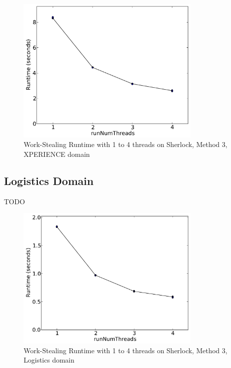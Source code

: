 \documentclass[12pt,twoside,abbrevs,msc,ai,notimes,logo,sansheadings]{infthesis}
\begin{document}
  \begin{figure}[!htbp]
  \begin{centering}
  \includegraphics[width=0.8\textwidth]{images/threads-xper5-sherlock-3-1}
  \par\end{centering}
  \caption{Work-Stealing Runtime with 1 to 4 threads on Sherlock, Method 3, XPERIENCE domain}
  \end{figure}
  
  \subsection{Logistics Domain}
  TODO
  
  \begin{figure}[!htbp]
  \begin{centering}
  \includegraphics[width=0.8\textwidth]{images/threads-log3-sherlock-3-1}
  \par\end{centering}
  \caption{Work-Stealing Runtime with 1 to 4 threads on Sherlock, Method 3, Logistics domain}
  \end{figure}
  
\end{document}
